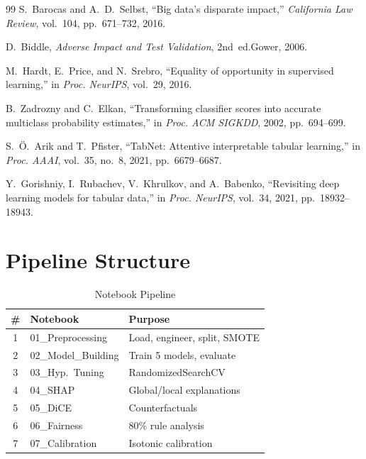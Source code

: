 \documentclass[journal]{IEEEtran}
\begin{document}
\begin{thebibliography}{99}
S.~Barocas and A.~D.~Selbst,
``Big data's disparate impact,''
\textit{California Law Review}, vol.~104, pp.~671--732, 2016.

D.~Biddle,
\textit{Adverse Impact and Test Validation}, 2nd~ed.\hspace{0.5em}Gower, 2006.

M.~Hardt, E.~Price, and N.~Srebro,
``Equality of opportunity in supervised learning,''
in \textit{Proc. NeurIPS}, vol.~29, 2016.

B.~Zadrozny and C.~Elkan,
``Transforming classifier scores into accurate multiclass probability estimates,''
in \textit{Proc. ACM SIGKDD}, 2002, pp.~694--699.

S.~\"{O}.~Arik and T.~Pfister,
``TabNet: Attentive interpretable tabular learning,''
in \textit{Proc. AAAI}, vol.~35, no.~8, 2021, pp.~6679--6687.

Y.~Gorishniy, I.~Rubachev, V.~Khrulkov, and A.~Babenko,
``Revisiting deep learning models for tabular data,''
in \textit{Proc. NeurIPS}, vol.~34, 2021, pp.~18932--18943.

\end{thebibliography}


\appendices

\section{Pipeline Structure}

\begin{table}[!t]
\centering
\caption{Notebook Pipeline}
\label{tab:pipeline}
\begin{tabular}{clp{3.5cm}}
\toprule
\textbf{\#} & \textbf{Notebook} & \textbf{Purpose} \\
\midrule
1 & 01\_Preprocessing & Load, engineer, split, SMOTE \\
2 & 02\_Model\_Building & Train 5 models, evaluate \\
3 & 03\_Hyp.\ Tuning & RandomizedSearchCV \\
4 & 04\_SHAP & Global/local explanations \\
5 & 05\_DiCE & Counterfactuals \\
6 & 06\_Fairness & 80\% rule analysis \\
7 & 07\_Calibration & Isotonic calibration \\
\bottomrule
\end{tabular}
\end{table}
\end{document}
